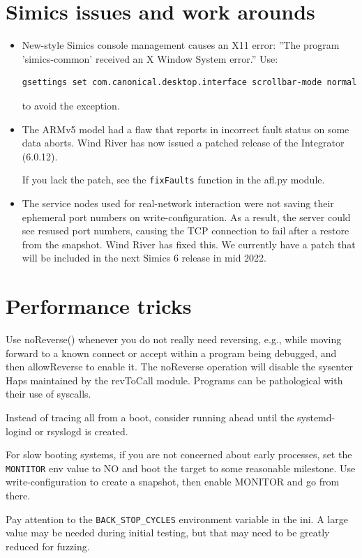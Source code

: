 \documentclass[titlepage]{article}
\begin{document}
\begin{appendices}
\section{Simics issues and work arounds}
\begin{itemize}
\item New-style Simics console management causes an X11 error: ''The program 'simics-common' received an X Window System error.''
Use:
\begin{verbatim}
gsettings set com.canonical.desktop.interface scrollbar-mode normal
\end{verbatim}
\noindent to avoid the exception.
\item The ARMv5 model had a flaw that reports in incorrect fault status on some data aborts.  Wind River has now issued a patched release
of the Integrator (6.0.12).

If you lack the patch, see the {\tt fixFaults} function in the afl.py module.

\item The service nodes used for real-network interaction were not saving their ephemeral port numbers on write-configuration.  As a result,
the server could see resused port numbers, causing the TCP connection to fail after a restore from the snapshot.  Wind River has fixed this.
We currently have a patch that will be included in the next Simics 6 release in mid 2022.
\end{itemize}

\section{Performance tricks}
Use noReverse() whenever you do not really need reversing, e.g., while moving forward to a known connect or accept
within a program being debugged, and then allowReverse to enable it. The noReverse operation will disable the sysenter
Haps maintained by the revToCall module.  Programs can be pathological with their use of syscalls.

Instead of tracing all from a boot, consider running ahead until the systemd-logind or rsyslogd is created.

For slow booting systems, if you are not concerned about early processes, set the {\tt MONTITOR} env value to NO and boot the target to some reasonable milestone.
Use write-configuration to create a snapshot, then enable MONITOR and go from there.   

Pay attention to the {\tt BACK\_STOP\_CYCLES} environment variable in the ini.  A large value may be needed during initial testing,
but that may need to be greatly reduced for fuzzing.


\end{appendices}
\end{document}
